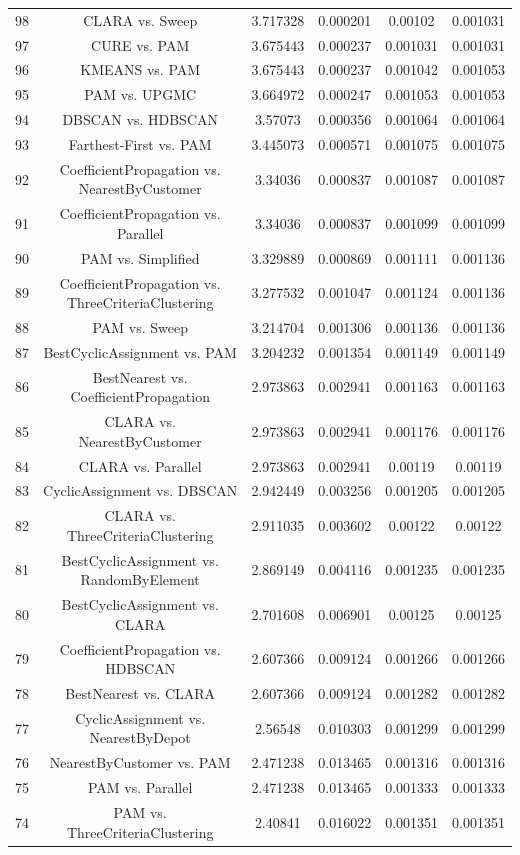 \documentclass[a4paper,10pt]{article}
\begin{document}
\begin{landscape}
\begin{table}[!htp]
\begin{tabular}{cccccc}
98&CLARA vs. Sweep&3.717328&0.000201&0.00102&0.001031\\
97&CURE vs. PAM&3.675443&0.000237&0.001031&0.001031\\
96&KMEANS vs. PAM&3.675443&0.000237&0.001042&0.001053\\
95&PAM vs. UPGMC&3.664972&0.000247&0.001053&0.001053\\
94&DBSCAN vs. HDBSCAN&3.57073&0.000356&0.001064&0.001064\\
93&Farthest-First vs. PAM&3.445073&0.000571&0.001075&0.001075\\
92&CoefficientPropagation vs. NearestByCustomer&3.34036&0.000837&0.001087&0.001087\\
91&CoefficientPropagation vs. Parallel&3.34036&0.000837&0.001099&0.001099\\
90&PAM vs. Simplified&3.329889&0.000869&0.001111&0.001136\\
89&CoefficientPropagation vs. ThreeCriteriaClustering&3.277532&0.001047&0.001124&0.001136\\
88&PAM vs. Sweep&3.214704&0.001306&0.001136&0.001136\\
87&BestCyclicAssignment vs. PAM&3.204232&0.001354&0.001149&0.001149\\
86&BestNearest vs. CoefficientPropagation&2.973863&0.002941&0.001163&0.001163\\
85&CLARA vs. NearestByCustomer&2.973863&0.002941&0.001176&0.001176\\
84&CLARA vs. Parallel&2.973863&0.002941&0.00119&0.00119\\
83&CyclicAssignment vs. DBSCAN&2.942449&0.003256&0.001205&0.001205\\
82&CLARA vs. ThreeCriteriaClustering&2.911035&0.003602&0.00122&0.00122\\
81&BestCyclicAssignment vs. RandomByElement&2.869149&0.004116&0.001235&0.001235\\
80&BestCyclicAssignment vs. CLARA&2.701608&0.006901&0.00125&0.00125\\
79&CoefficientPropagation vs. HDBSCAN&2.607366&0.009124&0.001266&0.001266\\
78&BestNearest vs. CLARA&2.607366&0.009124&0.001282&0.001282\\
77&CyclicAssignment vs. NearestByDepot&2.56548&0.010303&0.001299&0.001299\\
76&NearestByCustomer vs. PAM&2.471238&0.013465&0.001316&0.001316\\
75&PAM vs. Parallel&2.471238&0.013465&0.001333&0.001333\\
74&PAM vs. ThreeCriteriaClustering&2.40841&0.016022&0.001351&0.001351\\

\end{tabular}
\end{table}
\end{landscape}
\end{document}
